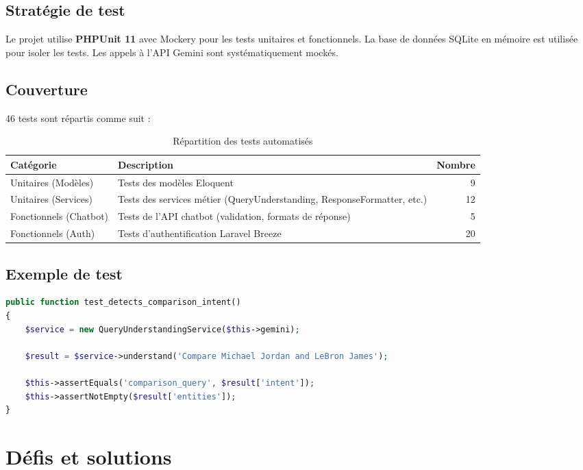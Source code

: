 \documentclass[12pt,a4paper]{report}
\begin{document}
\subsection{Stratégie de test}

Le projet utilise \textbf{PHPUnit 11} avec Mockery pour les tests unitaires et fonctionnels. La base de données SQLite en mémoire est utilisée pour isoler les tests. Les appels à l'API Gemini sont systématiquement mockés.

\subsection{Couverture}

46 tests sont répartis comme suit :

\begin{table}[h]
\centering
\begin{tabularx}{\textwidth}{lXr}
\toprule
\textbf{Catégorie} & \textbf{Description} & \textbf{Nombre} \\
\midrule
Unitaires (Modèles) & Tests des modèles Eloquent & 9 \\
Unitaires (Services) & Tests des services métier (QueryUnderstanding, ResponseFormatter, etc.) & 12 \\
Fonctionnels (Chatbot) & Tests de l'API chatbot (validation, formats de réponse) & 5 \\
Fonctionnels (Auth) & Tests d'authentification Laravel Breeze & 20 \\
\bottomrule
\end{tabularx}
\caption{Répartition des tests automatisés}
\end{table}

\subsection{Exemple de test}

\begin{lstlisting}[language=PHP,caption=Test unitaire du QueryUnderstandingService]
public function test_detects_comparison_intent()
{
    $service = new QueryUnderstandingService($this->gemini);
    
    $result = $service->understand('Compare Michael Jordan and LeBron James');
    
    $this->assertEquals('comparison_query', $result['intent']);
    $this->assertNotEmpty($result['entities']);
}
\end{lstlisting}

\section{Défis et solutions}
\end{document}

